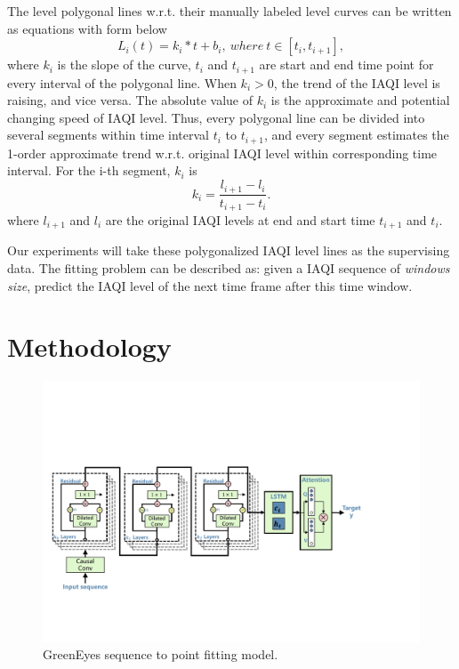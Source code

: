 \documentclass[sigconf]{acmart}
\begin{document}
The level polygonal lines w.r.t. their manually labeled level curves can be written as equations with form below
\begin{equation}
    \label{formula:polygonal}
    L_i(t)=k_i*t+b_i,\ where\ t\in[t_i,t_{i+1}],
\end{equation}
where $k_i$ is the slope of the curve, $t_i$ and $t_{i+1}$ are start and end time point for every interval of the polygonal line. When $k_i>0$, the trend of the IAQI level is raising, and vice versa. The absolute value of $k_i$ is the approximate and potential changing speed of IAQI level. Thus, every polygonal line can be divided into several segments within time interval $t_i$ to $t_{i+1}$, and every segment estimates the 1-order approximate trend w.r.t. original IAQI level within corresponding time interval. For the i-th segment, $k_i$ is
\begin{equation}
    k_i = \frac{l_{i+1}-l_i}{t_{i+1}-t_i}.
\end{equation}
where $l_{i+1}$ and $l_i$ are the original IAQI levels at end and start time $t_{i+1}$ and $t_i$.

Our experiments will take these polygonalized IAQI level lines as the supervising data. The fitting problem can be described as: given a IAQI sequence of \textit{windows size}, predict the IAQI level of the next time frame after this time window.


\section{Methodology}\label{sec:model_design}

\begin{figure}[!htbp]
  \centering
  \includegraphics[width=0.8\linewidth]{fig/model/WaveNet_LSTM_ver0.1.pdf}
  \caption{GreenEyes sequence to point fitting model.}
  \label{fig:greeneyes_model}
\end{figure}
\end{document}
